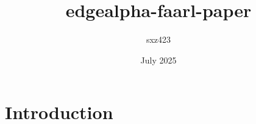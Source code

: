 \documentclass{article}
\title{edgealpha-faarl-paper}
\author{sxz423 }
\date{July 2025}
\begin{document}
\maketitle

\section{Introduction}
\end{document}

